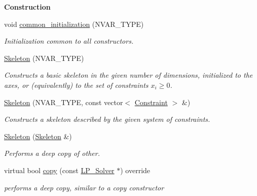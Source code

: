 \begin{Indent}\textbf{ Construction}\par
\begin{DoxyCompactItemize}
\item 
\mbox{\label{group___c_l_s_solvers_aa63d9454338c84be898e1a604eba3527}} 
void \hyperlink{group___c_l_s_solvers_aa63d9454338c84be898e1a604eba3527}{common\+\_\+initialization} (N\+V\+A\+R\+\_\+\+T\+Y\+PE)
\begin{DoxyCompactList}\small\item\em Initialization common to all constructors. \end{DoxyCompactList}\item 
\hyperlink{group___c_l_s_solvers_ad9f2f64c49dbf96ebd30852e670e7642}{Skeleton} (N\+V\+A\+R\+\_\+\+T\+Y\+PE)
\begin{DoxyCompactList}\small\item\em Constructs a basic skeleton in the given number of dimensions, initialized to the axes, or (equivalently) to the set of constraints $ x_i \geq 0 $. \end{DoxyCompactList}\item 
\hyperlink{group___c_l_s_solvers_ad61d70c2397e93141de3ad3c987b1828}{Skeleton} (N\+V\+A\+R\+\_\+\+T\+Y\+PE, const vector$<$ \hyperlink{group___c_l_s_solvers_class_l_p___solvers_1_1_constraint}{Constraint} $>$ \&)
\begin{DoxyCompactList}\small\item\em Constructs a skeleton described by the given system of constraints. \end{DoxyCompactList}\item 
\mbox{\label{group___c_l_s_solvers_ae1d6983329c8624014fa5c9d66f75ac3}} 
\hyperlink{group___c_l_s_solvers_ae1d6983329c8624014fa5c9d66f75ac3}{Skeleton} (\hyperlink{group___c_l_s_solvers_class_l_p___solvers_1_1_skeleton}{Skeleton} \&)
\begin{DoxyCompactList}\small\item\em Performs a deep copy of {\ttfamily other}. \end{DoxyCompactList}\item 
virtual bool \hyperlink{group___c_l_s_solvers_a242f1dc35468e2326e6f7c10bc0d0fd4}{copy} (const \hyperlink{group___c_l_s_solvers_class_l_p___solvers_1_1_l_p___solver}{L\+P\+\_\+\+Solver} $\ast$) override
\begin{DoxyCompactList}\small\item\em performs a deep copy, similar to a copy constructor \end{DoxyCompactList}\end{DoxyCompactItemize}
\end{Indent}
